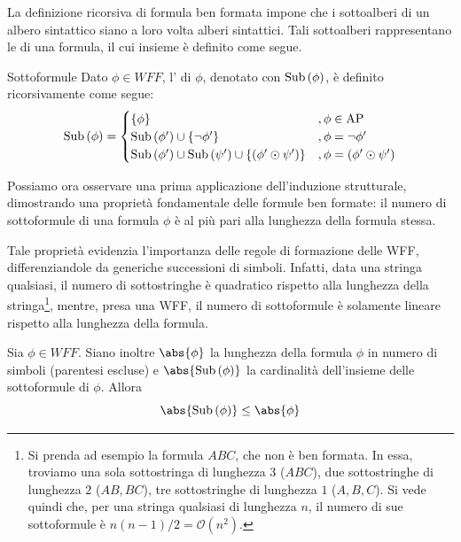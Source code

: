 La definizione ricorsiva di formula ben formata impone che i sottoalberi di un albero sintattico siano a loro volta alberi sintattici.
Tali sottoalberi rappresentano le  di una formula, il cui insieme è definito come segue.

\begin{definition}{Sottoformule}
  Dato \(\phi \in WFF\), l' di \(\phi\), denotato con \(\operatorname{Sub}\left(\phi\right)\), è definito ricorsivamente come segue:
  \[\Sub{\phi} = \begin{cases}
    \{\phi\} & ,\phi \in \AP\\
    \Sub{\phi'} \cup \{\neg \phi'\} & ,\phi = \neg \phi'\\
    \Sub{\phi'} \cup \Sub{\psi'} \cup \{(\phi' \odot \psi')\} & ,\phi = (\phi' \odot \psi')
  \end{cases}
  \]
\end{definition}

Possiamo ora osservare una prima applicazione dell'induzione strutturale, dimostrando una proprietà fondamentale delle formule ben formate: il numero di sottoformule di una formula \(\phi\) è al più pari alla lunghezza della formula stessa.

\begin{note}{}
  Tale proprietà evidenzia l'importanza delle regole di formazione delle WFF, differenziandole da generiche successioni di simboli.
  Infatti, data una stringa qualsiasi, il numero di sottostringhe è quadratico rispetto alla lunghezza della stringa\footnote{Si prenda ad esempio la formula \(ABC\), che non è ben formata. In essa, troviamo una sola sottostringa di lunghezza \(3\) (\(ABC\)), due sottostringhe di lunghezza \(2\) (\(AB,BC\)), tre sottostringhe di lunghezza \(1\) (\(A,B,C\)). Si vede quindi che, per una stringa qualsiasi di lunghezza \(n\), il numero di sue sottoformule è \(n(n-1)/2=\mathcal{O}(n^{2})\).}, mentre, presa una WFF, il numero di sottoformule è solamente lineare rispetto alla lunghezza della formula.
\end{note}

\begin{proposition}{}
  Sia \(\phi \in WFF\). Siano inoltre \(\abs{\phi}\) la lunghezza della formula \(\phi\) in numero di simboli (parentesi escluse) e \(\abs{\Sub{\phi}}\) la cardinalità dell'insieme delle sottoformule di \(\phi\). Allora
  \[\abs{\Sub{\phi}}\leq \abs{\phi}\]
\end{proposition}

